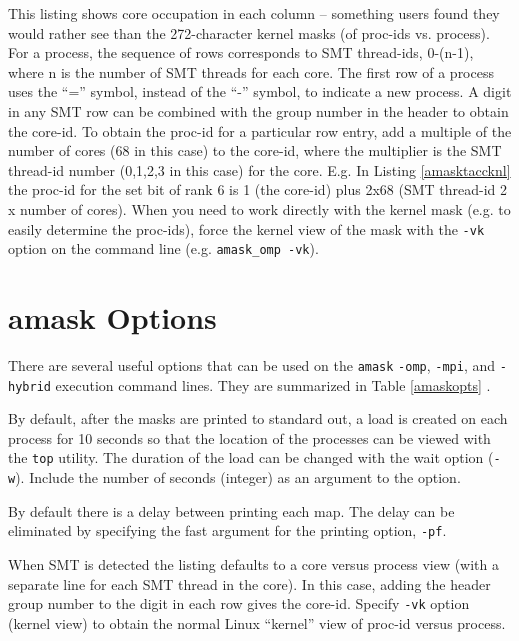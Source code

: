 \documentclass[10pt,a4paper]{report}
\begin{document}
This listing shows core occupation in each column -- something users found they would rather see than the 272-character kernel masks (of proc-ids vs. process).
For a process, the sequence of rows corresponds to SMT thread-ids, 0-(n-1), where n is the number of SMT threads for each core. 
The first row of a process uses the ``='' symbol, instead of the ``-'' symbol, to indicate a new process.
A digit in any SMT row can be combined with the group number in the header to obtain the core-id. 
To obtain the proc-id for a particular row entry, add a multiple of the number of cores (68 in this case)
to the core-id, where the multiplier is the SMT thread-id number (0,1,2,3 in this case) for the core.  
E.g. In Listing \ref{amasktaccknl} the proc-id for the set bit of rank 6 is 1 (the core-id) plus 2x68 (SMT thread-id 2 x number of cores). 
When you need to work directly with the kernel mask (e.g. to easily determine the proc-ids), 
force the kernel view of the mask with the \verb+-vk+ option on the command line (e.g. \verb+amask_omp -vk+). 

\clearpage



\section{amask Options}
There are several useful options that can be used on the \verb+amask+ \verb+-omp+, \verb+-mpi+, and
\verb+-hybrid+ execution command lines.  They are summarized in Table \ref{amaskopts} .

By default, after the masks are printed to standard out, a load is created on each process
for 10 seconds so that the location of the processes can be viewed with the \verb+top+ 
utility. The duration of the load can be changed with the wait option (\verb+-w+). Include
the number of seconds (integer) as an argument to the option. 

By default there is a delay between printing each map. The delay can be eliminated by specifying
the fast argument for the printing option, \verb+-pf+.

When SMT is detected the listing defaults to a core versus process view (with a
separate line for each SMT thread in the core).  
In this case, adding the header group number to the digit in each row gives the core-id.
Specify \verb+-vk+ option (kernel view) to obtain the normal Linux ``kernel'' view of
proc-id versus process.
\end{document}
